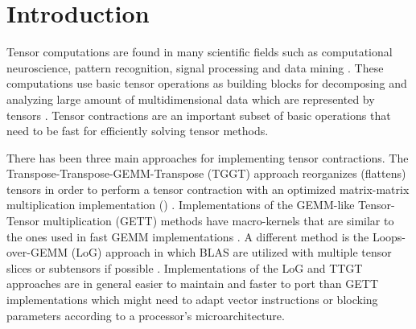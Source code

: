 \section{Introduction}
\label{sec:introduction}
Tensor computations are found in many scientific fields such as computational neuroscience, pattern recognition, signal processing and data mining \cite{karahan:2015:tensor, papalexakis:2017:tensors}.
These computations use basic tensor operations as building blocks for decomposing and analyzing large amount of multidimensional data which are represented by tensors \cite{lee:2018:fundamental, kolda:2009:decompositions}. 
Tensor contractions are an important subset of basic operations that need to be fast for efficiently solving tensor methods.

There has been three main approaches for implementing tensor contractions.
The Transpose-Transpose-GEMM-Transpose (TGGT) approach reorganizes (flattens) tensors in order to perform a tensor contraction with an optimized matrix-matrix multiplication implementation () \cite{bader:2006:algorithm862, solomonik:2013:cyclops}.
Implementations of the GEMM-like Tensor-Tensor multiplication (GETT) methods have macro-kernels that are similar to the ones used in fast GEMM implementations \cite{springer:2018:design, matthews:2018:high}.
A different method is the Loops-over-GEMM (LoG) approach in which BLAS are utilized with multiple tensor slices or subtensors if possible \cite{dinapoli:2014:towards.efficient.use, li:2015:input, shi:2016:tensor.contraction, bassoy:2019:ttv}.
Implementations of the LoG and TTGT approaches are in general easier to maintain and faster to port than GETT implementations which might need to adapt vector instructions or blocking parameters according to a processor's microarchitecture.


